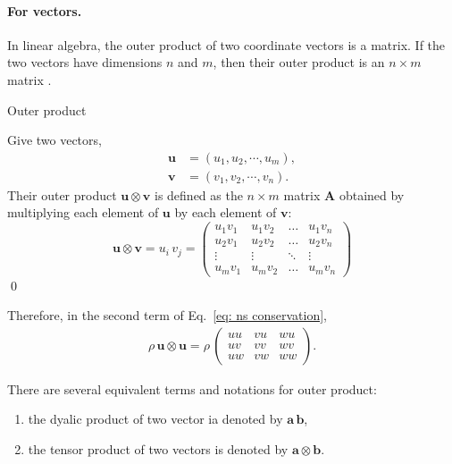 \paragraph{For vectors. }
In linear algebra, the outer product of two coordinate vectors is a matrix. If the two vectors have dimensions $n$ and $m$, then their outer product is an $n \times m$ matrix \citet{wiki:outer_product}. 
\begin{definition}
    Outer product

    Give two vectors, 
    \begin{align}
    \bm{u} &= \left(u_{1}, u_{2}, \cdots, u_{m}\right), \\ 
    \bm{v} &= \left(v_{1}, v_{2}, \cdots, v_{n}\right). 
    \end{align}
    Their outer product $\bm{u} \otimes \bm{v}$ is defined as the $n \times m$ matrix $\bm{A}$ obtained by multiplying each element of $\bm{u}$ by each element of $\bm{v}$: 
    \begin{equation}
    \bm{u} \otimes \bm{v} =
    u_i\,v_j =
    \begin{pmatrix}
        {u_{1} v_{1}} & {u_{1} v_{2}} & {\dots} & {u_{1} v_{n}} \\ 
        {u_{2} v_{1}} & {u_{2} v_{2}} & {\dots} & {u_{2} v_{n}} \\ 
        {\vdots} & {\vdots} & {\ddots} & {\vdots} \\ 
        {u_{m} v_{1}} & {u_{m} v_{2}} & {\dots} & {u_{m} v_{n}}
    \end{pmatrix}
    \end{equation}
    \qed
\end{definition}
Therefore, in the second term of Eq.~\eqref{eq: ns conservation}, 
\begin{equation}
\begin{aligned}
    \rho\,\bm{u} \otimes \bm{u} = \rho\,
    \begin{pmatrix}
        uu & vu & wu \\
        uv & vv & wv \\
        uw & vw & ww 
    \end{pmatrix}.
\end{aligned}
\end{equation}

There are several equivalent terms and notations for outer product: 
\begin{enumerate}
    \item the dyalic product of two vector ia denoted by $\bm{a\,b}$, 
    \item the tensor product of two vectors is denoted by $\bm{a} \otimes \bm{b}$. 
\end{enumerate}

